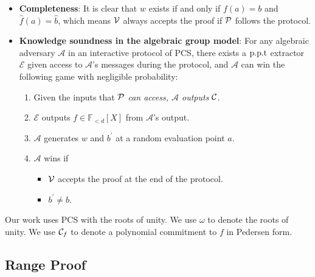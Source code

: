\begin{definition}
\begin{enumerate}
\begin{enumerate}
    \end{enumerate}
\end{enumerate}
\begin{itemize}
    \item \textbf{Completeness}: It is clear that $w$ exists if and only if $f(a)=b$ and $\hat{f}(a)=\hat{b}$, which means $\mathcal{V}$ always accepts the proof if $\mathcal{P}$ follows the protocol.
    \item \textbf{Knowledge soundness in the algebraic group model}: For any algebraic adversary $\mathcal{A}$ in an interactive protocol of PCS, there exists a $\text{p.p.t}$ extractor $\mathcal{E}$ given access to $\mathcal{A}$'s messages during the protocol, and $\mathcal{A}$ can win the following game with negligible probability:
    \begin{enumerate}
        \item Given the inputs that $\mathcal{P}$ \textit{can access, $\mathcal{A}$ outputs} $\mathcal{C}$.
        \item $\mathcal{E}$ outputs $f\in\mathbb{F}_{<d}[X]$ from $\mathcal{A}$'s output.
        \item $\mathcal{A}$ generates $w$ and $b^\prime$ at a random evaluation point $a$.
        \item $\mathcal{A}$ wins if
        \begin{itemize}
            \item $\mathcal{V}$ accepts the proof at the end of the protocol.
            \item $b^\prime\ne{b}$.
        \end{itemize}
    \end{enumerate}
\end{itemize}
\end{definition}
Our work uses PCS with the roots of unity. We use $\omega$ to denote the roots of unity. We use $\mathcal{C}_f$ to denote a polynomial commitment to $f$ in Pedersen form.

\subsection{Range Proof}
\label{sec:range}

